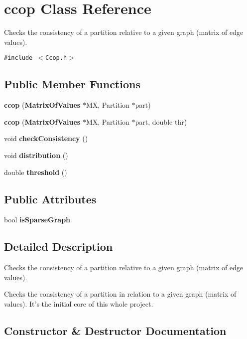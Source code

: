 \section{ccop Class Reference}
\label{classccop}
Checks the consistency of a partition relative to a given graph (matrix of edge values).  


{\tt \#include $<$Ccop.h$>$}

\subsection*{Public Member Functions}
\begin{CompactItemize}
\item 
{\bf ccop} ({\bf Matrix\-Of\-Values} $\ast$MX, Partition $\ast$part)
\item 
{\bf ccop} ({\bf Matrix\-Of\-Values} $\ast$MX, Partition $\ast$part, double thr)\label{classccop_a1}

\item 
void {\bf check\-Consistency} ()\label{classccop_a2}

\item 
void {\bf distribution} ()\label{classccop_a3}

\item 
double {\bf threshold} ()\label{classccop_a4}

\end{CompactItemize}
\subsection*{Public Attributes}
\begin{CompactItemize}
\item 
bool {\bf is\-Sparse\-Graph}\label{classccop_o0}

\end{CompactItemize}


\subsection{Detailed Description}
Checks the consistency of a partition relative to a given graph (matrix of edge values). 

Checks the consistency of a partition in relation to a given graph (matrix of values). It's the initial core of this whole project. 



\subsection{Constructor \& Destructor Documentation}
